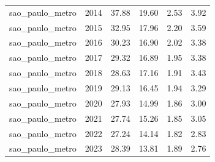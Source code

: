 \begin{table}[!htbp]
\begin{tabular}{ll
rrrr
}
sao_paulo_metro & 2014 & 37.88 & 19.60 & 2.53 & 3.92 \\
sao_paulo_metro & 2015 & 32.95 & 17.96 & 2.20 & 3.59 \\
sao_paulo_metro & 2016 & 30.23 & 16.90 & 2.02 & 3.38 \\
sao_paulo_metro & 2017 & 29.32 & 16.89 & 1.95 & 3.38 \\
sao_paulo_metro & 2018 & 28.63 & 17.16 & 1.91 & 3.43 \\
sao_paulo_metro & 2019 & 29.13 & 16.45 & 1.94 & 3.29 \\
sao_paulo_metro & 2020 & 27.93 & 14.99 & 1.86 & 3.00 \\
sao_paulo_metro & 2021 & 27.74 & 15.26 & 1.85 & 3.05 \\
sao_paulo_metro & 2022 & 27.24 & 14.14 & 1.82 & 2.83 \\
sao_paulo_metro & 2023 & 28.39 & 13.81 & 1.89 & 2.76 \\
\bottomrule
\end{tabular}
\end{table}
